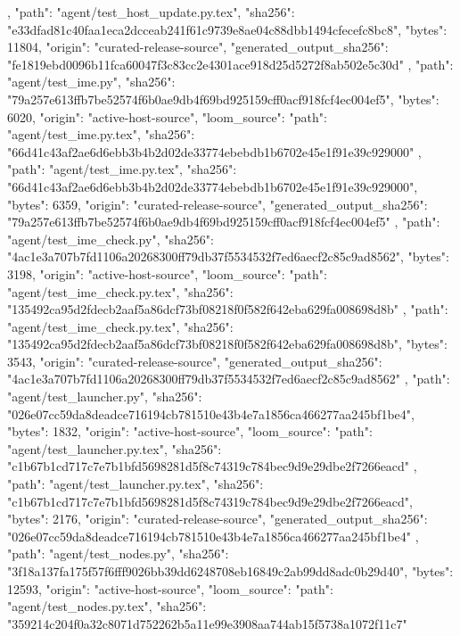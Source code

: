 {{{      }
    },
    {
      "path": "agent/test_host_update.py.tex",
      "sha256": "e33dfad81c40faa1eca2dcceab241f61c9739e8ae04c88dbb1494cfecefc8bc8",
      "bytes": 11804,
      "origin": "curated-release-source",
      "generated_output_sha256": "fe1819ebd0096b11fca60047f3c83cc2e4301ace918d25d5272f8ab502e5c30d"
    },
    {
      "path": "agent/test_ime.py",
      "sha256": "79a257e613ffb7be52574f6b0ae9db4f69bd925159cff0acf918fcf4ec004ef5",
      "bytes": 6020,
      "origin": "active-host-source",
      "loom_source": {
        "path": "agent/test_ime.py.tex",
        "sha256": "66d41c43af2ae6d6ebb3b4b2d02de33774ebebdb1b6702e45e1f91e39c929000"
      }
    },
    {
      "path": "agent/test_ime.py.tex",
      "sha256": "66d41c43af2ae6d6ebb3b4b2d02de33774ebebdb1b6702e45e1f91e39c929000",
      "bytes": 6359,
      "origin": "curated-release-source",
      "generated_output_sha256": "79a257e613ffb7be52574f6b0ae9db4f69bd925159cff0acf918fcf4ec004ef5"
    },
    {
      "path": "agent/test_ime_check.py",
      "sha256": "4ac1e3a707b7fd1106a20268300ff79db37f5534532f7ed6aecf2c85c9ad8562",
      "bytes": 3198,
      "origin": "active-host-source",
      "loom_source": {
        "path": "agent/test_ime_check.py.tex",
        "sha256": "135492ca95d2fdecb2aaf5a86dcf73bf08218f0f582f642eba629fa008698d8b"
      }
    },
    {
      "path": "agent/test_ime_check.py.tex",
      "sha256": "135492ca95d2fdecb2aaf5a86dcf73bf08218f0f582f642eba629fa008698d8b",
      "bytes": 3543,
      "origin": "curated-release-source",
      "generated_output_sha256": "4ac1e3a707b7fd1106a20268300ff79db37f5534532f7ed6aecf2c85c9ad8562"
    },
    {
      "path": "agent/test_launcher.py",
      "sha256": "026e07cc59da8deadce716194cb781510e43b4e7a1856ca466277aa245bf1be4",
      "bytes": 1832,
      "origin": "active-host-source",
      "loom_source": {
        "path": "agent/test_launcher.py.tex",
        "sha256": "c1b67b1cd717c7e7b1bfd5698281d5f8c74319c784bec9d9e29dbe2f7266eacd"
      }
    },
    {
      "path": "agent/test_launcher.py.tex",
      "sha256": "c1b67b1cd717c7e7b1bfd5698281d5f8c74319c784bec9d9e29dbe2f7266eacd",
      "bytes": 2176,
      "origin": "curated-release-source",
      "generated_output_sha256": "026e07cc59da8deadce716194cb781510e43b4e7a1856ca466277aa245bf1be4"
    },
    {
      "path": "agent/test_nodes.py",
      "sha256": "3f18a137fa175f57f6fff9026bb39dd6248708eb16849c2ab99dd8adc0b29d40",
      "bytes": 12593,
      "origin": "active-host-source",
      "loom_source": {
        "path": "agent/test_nodes.py.tex",
        "sha256": "359214c204f0a32c8071d752262b5a11e99e3908aa744ab15f5738a1072f11c7"
}}}
